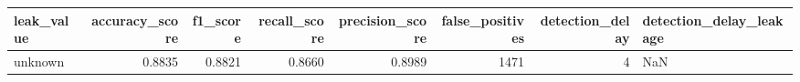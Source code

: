 \begin{tabular}{lrrrrrrl}
\toprule
leak\_value & accuracy\_score & f1\_score & recall\_score & precision\_score & false\_positives & detection\_delay & detection\_delay\_leakage \\
\midrule
unknown & 0.8835 & 0.8821 & 0.8660 & 0.8989 & 1471 & 4 & NaN \\
\bottomrule
\end{tabular}
